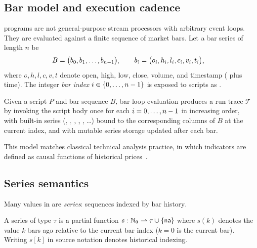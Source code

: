 \documentclass[11pt,a4paper]{article}
\begin{document}
\subsection{Bar model and execution cadence}
\label{sec:bar-model}

\pine{} programs are not general-purpose stream processors with arbitrary
event loops.
They are evaluated against a finite sequence of market bars.
Let a bar series of length $n$ be
\begin{equation}
  B = \bigl(b_0, b_1, \ldots, b_{n-1}\bigr),
  \qquad
  b_{i} = \bigl(o_{i}, h_{i}, l_{i}, c_{i}, v_{i}, t_{i}\bigr),
  \label{eq:bars}
\end{equation}
where $o,h,l,c,v,t$ denote open, high, low, close, volume, and timestamp
(\ohlcv{} plus time).
The integer \emph{bar index} $i \in \{0,\ldots,n-1\}$ is exposed to
scripts as .

\begin{definition}
\label{def:barloop}
Given a script $P$ and bar sequence $B$, bar-loop evaluation produces a run
trace $\mathcal{T}$ by invoking the script body once for each
$i = 0,\ldots,n-1$ in increasing order, with built-in series
(, , , , , \ldots)
bound to the corresponding columns of $B$ at the current index, and with
mutable series storage updated after each bar.
\end{definition}

This model matches classical technical analysis practice, in which indicators
are defined as causal functions of historical prices~\citep{wilder1978new,box1970time,tsay2010analysis}.

\subsection{Series semantics}
\label{sec:series}

Many values in \pine{} are \emph{series}: sequences indexed by bar history.

\begin{definition}[Series]
\label{def:series}
A series of type $\tau$ is a partial function
$s: \mathbb{N}_0 \rightharpoonup \tau \cup \{\textsf{na}\}$ where $s(k)$ denotes the value
$k$ bars ago relative to the current bar index ($k=0$ is the current bar).
Writing $s[k]$ in source notation denotes historical indexing.
\end{definition}
\end{document}
